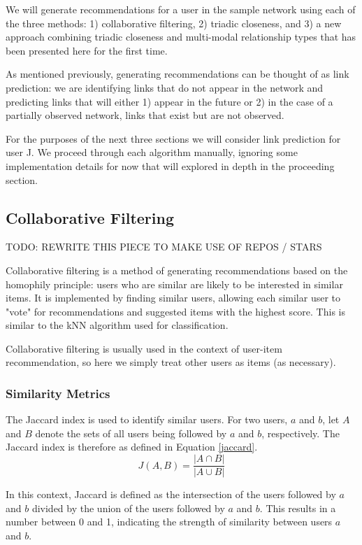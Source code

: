 We will generate recommendations for a user in the sample network using each of the three methods: 1) collaborative filtering, 2) triadic closeness, and 3) a new approach combining triadic closeness and multi-modal relationship types that has been presented here for the first time.

As mentioned previously, generating recommendations can be thought of as link prediction: we are identifying links that do not appear in the network and predicting links that will either 1) appear in the future or 2) in the case of a partially observed network, links that exist but are not observed.

For the purposes of the next three sections we will consider link prediction for user J. We proceed through each algorithm manually, ignoring some implementation details for now that will explored in depth in the proceeding section.

\subsection{Collaborative Filtering}
TODO: REWRITE THIS PIECE TO MAKE USE OF REPOS / STARS

Collaborative filtering is a method of generating recommendations based on the homophily principle: users who are similar are likely to be interested in similar items. It is implemented by finding similar users, allowing each similar user to "vote" for recommendations and suggested items with the highest score. This is similar to the kNN algorithm used for classification.\cite{cf}

Collaborative filtering is usually used in the context of user-item recommendation, so here we simply treat other users as items (as necessary).


\subsubsection{Similarity Metrics}
The Jaccard index is used to identify similar users. For two users, $a$ and $b$, let $A$ and $B$ denote the sets of all users being followed by $a$ and $b$, respectively. The Jaccard index is therefore as defined in Equation \ref{jaccard}.
\begin{equation}
\label{jaccard}
J(A,B) = \frac{|A \cap B|}{|A \cup B|}
\end{equation}

In this context, Jaccard is defined as the intersection of the users followed by $a$ and $b$ divided by the union of the users followed by $a$ and $b$. This results in a number between 0 and 1, indicating the strength of similarity between users $a$ and $b$.
 
